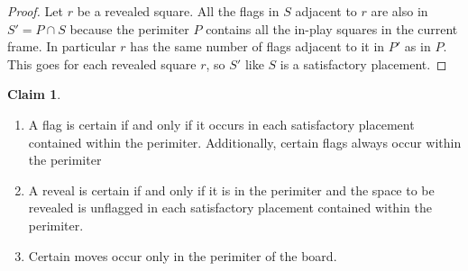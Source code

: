 \documentclass{article}
\theoremstyle{definition}
\theoremstyle{definition}
\theoremstyle{theorem}
\newtheorem{claim}{Claim}
\begin{document}
	\begin{proof}
		Let $r$ be a revealed square. All the flags in $S$ adjacent to $r$ are also in $S' = P \cap S$ because the perimiter $P$ contains all the in-play squares in the current frame. In particular $r$ has the same number of flags adjacent to it in $P'$ as in $P$. This goes for each revealed square $r$, so $S'$ like $S$ is a satisfactory placement.
	\end{proof}
	\begin{claim}
		
		
		\begin{enumerate}
		
		\item
		A flag is certain if and only if it occurs in each satisfactory placement contained within the perimiter. Additionally, certain flags always occur within the perimiter
		
		\item
		A reveal is certain if and only if it is in the perimiter and the space to be revealed is unflagged in each satisfactory placement contained within the perimiter.
		
		\item
		Certain moves occur only in the perimiter of the board.
		\end{enumerate}
	\end{claim}
\end{document}
